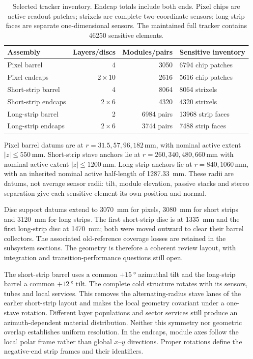 \begin{table}[tbp]
\centering\small
\caption{Selected tracker inventory. Endcap totals include both ends. Pixel
chips are active readout patches; strixels are complete two-coordinate sensors;
long-strip faces are separate one-dimensional sensors. The maintained full
tracker contains \num{46250} sensitive elements.}
\label{tab:tracker-inventory}
\begin{tabular}{@{}lrrp{58mm}@{}}\toprule
Assembly & Layers/discs & Modules/pairs & Sensitive inventory\\\midrule
Pixel barrel & 4 & \num{3050} & \num{6794} chip patches\\
Pixel endcaps & $2\times10$ & \num{2616} & \num{5616} chip patches\\
Short-strip barrel & 4 & \num{8064} & \num{8064} strixels\\
Short-strip endcaps & $2\times6$ & \num{4320} & \num{4320} strixels\\
Long-strip barrel & 2 & \num{6984} pairs & \num{13968} strip faces\\
Long-strip endcaps & $2\times6$ & \num{3744} pairs & \num{7488} strip faces\\\bottomrule
\end{tabular}
\end{table}

Pixel barrel datums are at $r=31.5,57,96,182\,\unit{\milli\metre}$, with nominal
active extent $|z|\leq\qty{550}{\milli\metre}$. Short-strip stave anchors lie at
$r=260,340,480,660\,\unit{\milli\metre}$ with nominal active extent
$|z|\leq\qty{1200}{\milli\metre}$. Long-strip anchors lie at
$r=840,1060\,\unit{\milli\metre}$, with an inherited nominal active half-length
of \qty{1287.33}{\milli\metre}. These radii are datums, not average sensor radii:
tilt, module elevation, passive stacks and stereo separation give each sensitive
element its own position and normal.

Disc support datums extend to \qty{3070}{\milli\metre} for pixels,
\qty{3080}{\milli\metre} for short strips and \qty{3120}{\milli\metre} for long
strips. The first short-strip disc is at \qty{1335}{\milli\metre} and the first
long-strip disc at \qty{1470}{\milli\metre}; both were moved outward to clear
their barrel collectors. The associated old-reference coverage losses are
retained in the subsystem sections. The geometry is therefore a coherent
review layout, with integration and transition-performance questions still open.

The short-strip barrel uses a common $+\qty{15}{\degree}$ azimuthal tilt and the
long-strip barrel a common $+\qty{12}{\degree}$ tilt. The complete cold structure
rotates with its sensors, tubes and local services. This removes the
alternating-radius stave lanes of the earlier short-strip layout and makes the
local geometry covariant under a one-stave rotation. Different layer
populations and sector services still produce an azimuth-dependent material
distribution. Neither this symmetry nor geometric overlap establishes uniform
resolution. In the endcaps, module axes follow the local polar frame rather
than global $x$--$y$ directions. Proper rotations define the negative-end strip
frames and their identifiers.

